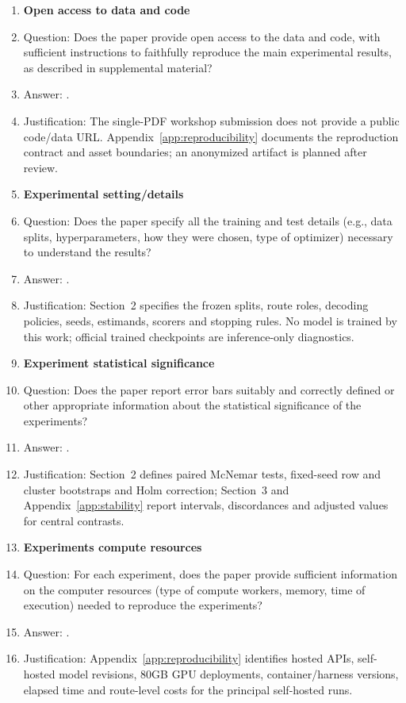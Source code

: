 \begin{enumerate}
\item {\bf Open access to data and code}
\item[] Question: Does the paper provide open access to the data and code, with sufficient instructions to faithfully reproduce the main experimental results, as described in supplemental material?
\item[] Answer: \answerNo{}.
\item[] Justification: The single-PDF workshop submission does not provide a public code/data URL. Appendix~\ref{app:reproducibility} documents the reproduction contract and asset boundaries; an anonymized artifact is planned after review.

\item {\bf Experimental setting/details}
\item[] Question: Does the paper specify all the training and test details (e.g., data splits, hyperparameters, how they were chosen, type of optimizer) necessary to understand the results?
\item[] Answer: \answerYes{}.
\item[] Justification: Section~2 specifies the frozen splits, route roles, decoding policies, seeds, estimands, scorers and stopping rules. No model is trained by this work; official trained checkpoints are inference-only diagnostics.

\item {\bf Experiment statistical significance}
\item[] Question: Does the paper report error bars suitably and correctly defined or other appropriate information about the statistical significance of the experiments?
\item[] Answer: \answerYes{}.
\item[] Justification: Section~2 defines paired McNemar tests, fixed-seed row and cluster bootstraps and Holm correction; Section~3 and Appendix~\ref{app:stability} report intervals, discordances and adjusted values for central contrasts.

\item {\bf Experiments compute resources}
\item[] Question: For each experiment, does the paper provide sufficient information on the computer resources (type of compute workers, memory, time of execution) needed to reproduce the experiments?
\item[] Answer: \answerYes{}.
\item[] Justification: Appendix~\ref{app:reproducibility} identifies hosted APIs, self-hosted model revisions, 80GB GPU deployments, container/harness versions, elapsed time and route-level costs for the principal self-hosted runs.


\end{enumerate}
